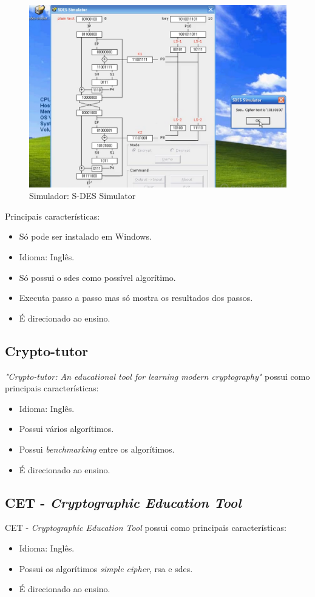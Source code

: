 \begin{figure}[H]
    \centering
    \caption{Simulador: S-DES Simulator}
    \includegraphics[width=.75\linewidth]{Simuladores/SDESSimulatorXp.png}
\end{figure}

Principais características:
\begin{itemize}
    \item Só pode ser instalado em Windows.
    \item Idioma: Inglês.
    \item Só possui o \acrshort{sdes} como possível algorítimo.
    \item Executa passo a passo mas só mostra os resultados dos passos.
    \item É direcionado ao ensino.
\end{itemize}

\subsection{Crypto-tutor}
\textit{"Crypto-tutor: An educational tool for learning modern cryptography"} \cite{luburic16} possui como principais características:
\begin{itemize}
    \item Idioma: Inglês.
    \item Possui vários algorítimos.
    \item Possui \textit{benchmarking} entre os algorítimos.
    \item É direcionado ao ensino.
\end{itemize}

\subsection{CET - \textit{Cryptographic Education Tool}}
CET - \textit{Cryptographic Education Tool} \cite{abuzaid11} possui como principais características:
\begin{itemize}
    \item Idioma: Inglês.
    \item Possui os algorítimos \textit{simple cipher}, \acrshort{rsa} e \acrshort{sdes}.
    \item É direcionado ao ensino.
\end{itemize}

